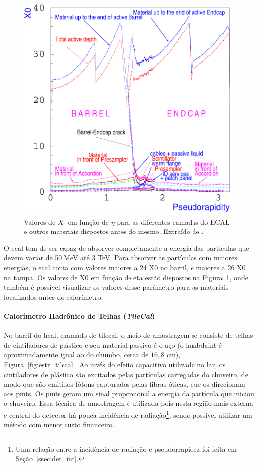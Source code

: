 \begin{figure}[h!t]
\centering
\includegraphics[width=.6\textwidth]{imagens/cal_em_x0.pdf}
\caption[Valores de $X_0$ em função de $\eta$ para as diferentes camadas do ECAL
e outros materiais dispostos antes do mesmo]{Valores de $X_0$ em função de $\eta$ para as diferentes camadas do ECAL
e outros materiais dispostos antes do mesmo. Extraído de \cite{cal_tdr}.}
\label{fig:cal_em_x0}
\end{figure}


O \gls{ecal} tem de ser capaz de absorver completamente a energia
das partículas que devem variar de 50 MeV até 3 TeV. 
Para absorver as partículas com maiores energias, o \gls{ecal} conta com valores
maiores a 24 \gls{X0} no barril, e maiores a 26 \gls{X0} na tampa. Os valores de \gls{X0} em 
função de \gls{eta} estão dispostos na Figura~\ref{fig:cal_em_x0}, onde também é possível
visualizar os valores desse parâmetro para os materiais localizados antes do
calorímetro.

\paragraph{Calorímetro Hadrônico de Telhas (\emph{TileCal})}
\label{par:cal_tilecal}

No barril do \gls{hcal}, chamado de \gls{tilecal}, o meio de amostragem se consiste de telhas de
cintiladores de plástico e seu material passivo é o aço (o \gls{lambdaint} é
aproximadamente igual ao do chumbo, cerca de $16,8$ cm), Figura~\ref{fig:estr_tilecal}. 
Ao invés do efeito capacitivo utilizado no \gls{lar}, os cintiladores de
plástico são excitados pelas partículas carregadas do chuveiro, de modo que são
emitidos fótons capturados pelas fibras óticas, que os direcionam aos
\glspl{pmt}. Os \glspl{pmt} geram um sinal proporcional a energia da partícula
que iniciou o chuveiro.
Essa técnica de amostragem é utilizada pois nesta região mais externa e central do detector 
há pouca incidência de radiação\footnote{Uma relação entre a incidência de
radiação e pseudorrapidez foi feita em Seção~\ref{ssec:det_int}.\label{fn:radiacao}}, 
sendo possível utilizar um método com menor custo financeiro.

